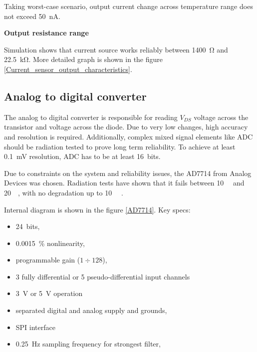         Taking worst-case scenario, output current change across temperature range does not exceed \SI{50}{\nano\ampere}.

        \bigskip\textbf{Output resistance range}
        
        Simulation shows that current source works reliably between \SI{1400}{\ohm} and \SI{22.5}{\kilo\ohm}. More detailed graph is shown in the figure \ref{Current_sensor_output_characteristics}.

    \subsection{Analog to digital converter}
        The analog to digital converter is responsible for reading $V_{DS}$ voltage across the transistor and voltage across the diode. Due to very low changes, high accuracy and resolution is required. Additionally, complex mixed signal elements like ADC should be radiation tested to prove long term reliability. To achieve at least \SI{0.1}{\milli\volt} resolution, ADC has to be at least \SI{16}{bits}.

        Due to constraints on the system and reliability issues, the AD7714 from Analog Devices was chosen. Radiation tests have shown that it fails between \SI{10}{\kilo\rad} and \SI{20}{\kilo\rad}, with no degradation up to \SI{10}{\kilo\rad} \cite{ADC_radiation_tests}.

\newpage
        Internal diagram is shown in the figure \ref{AD7714}. Key specs:
        \begin{itemize}
            \item \SI{24}{bits},
            \item \SI{0.0015}{\percent} nonlinearity,
            \item programmable gain ($1 \div 128$),
            \item 3 fully differential or 5 pseudo-differential input channels
            \item \SI{3}{\volt} or \SI{5}{\volt} operation
            \item separated digital and analog supply and grounds,
            \item SPI interface
            \item \SI{0.25}{\hertz} sampling frequency for strongest filter,
        \end{itemize}


